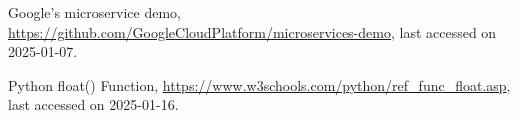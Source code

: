 \documentclass{article}
\begin{document}
\begin{thebibliography}{10}


 Google's microservice demo, \url{https://github.com/GoogleCloudPlatform/microservices-demo}, last accessed on 2025-01-07.

 Python float() Function, \url{https://www.w3schools.com/python/ref_func_float.asp}, last accessed on 2025-01-16.





\end{thebibliography}
\end{document}
